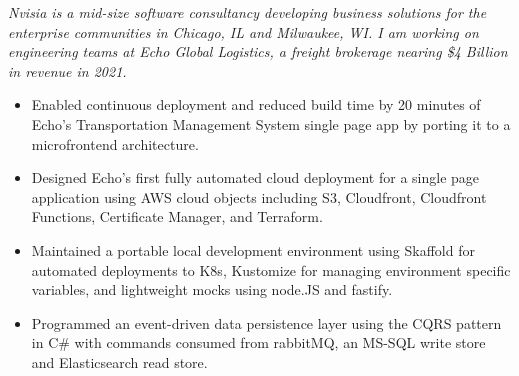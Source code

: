\documentclass[10pt,letter,ragged2e]{maltacv}
\begin{document}

\makecvheader

\begin{center}
  \begin{multicols}{5} %
  \end{multicols}
\end{center}

\smallskip
\textit{Nvisia is a mid-size software consultancy developing business solutions for the enterprise communities in Chicago, IL and Milwaukee, WI. I am working 
    on engineering teams at Echo Global Logistics, a freight brokerage nearing \$4 Billion in revenue in 2021.}\par
\smallskip
\begin{itemize}
  \item Enabled continuous deployment and reduced build time by 20 minutes of Echo's Transportation Management System single page app 
    by porting it to a microfrontend architecture. 
  \item Designed Echo's first fully automated cloud deployment for a single page application using 
    AWS cloud objects including S3, Cloudfront, Cloudfront Functions, Certificate Manager, and Terraform. 
  \item Maintained a portable local development environment using Skaffold for 
    automated deployments to K8s, Kustomize for managing environment specific 
    variables, and lightweight mocks using node.JS and fastify. 
  \item Programmed an event-driven data persistence layer using the CQRS pattern in 
    C\# with commands consumed from rabbitMQ, an MS-SQL write store and 
    Elasticsearch read store.
\end{itemize}
\divider
\end{document}
